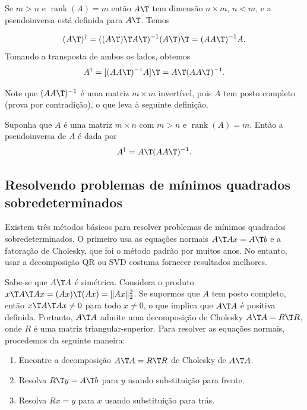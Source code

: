 \documentclass{article}
\DeclareMathOperator{\rank}{rank}
\begin{document}
Se \(m > n\) e \(\rank(A) = m\) então \(A\T \) tem dimensão \(n \times m\), \(n < m\), e a pseudoinversa está definida para \(A\T \). Temos

\[
    (A\T )^{\dagger} = ((A\T )\T A\T )^{-1}(A\T )\T  = (AA\T )^{-1}A.
\] Tomando a transposta de ambos os lados, obtemos
\[
    A^{\dagger} = [(AA\T )^{-1}A]\T  = A\T (AA\T )^{-1}.
\]

Note que \((AA\T )^{-1}\) é uma matriz \(m \times m\) invertível, pois \(A\) tem posto completo (prova por contradição), o que leva à seguinte definição.

\begin{defn}
    Suponha que \(A\) é uma matriz \(m \times n\) com \(m > n\) e \(\rank(A) = m\). Então a pseudoinversa de \(A\) é dada por
    \begin{equation}
        A^{\dagger} = A\T (AA\T )^{-1}.
    \end{equation}
\end{defn}

\subsection{Resolvendo problemas de mínimos quadrados sobredeterminados}

Existem três métodos básicos para resolver problemas de mínimos quadrados sobredeterminados. O primeiro usa as equações normais \(A\T Ax = A\T b\) e a fatoração de Cholesky, que foi o método padrão por muitos anos. No entanto, usar a decomposição QR ou SVD costuma fornecer resultados melhores.

Sabe-se que \(A\T A\) é simétrica. Considera o produto \(x\T A\T Ax = (Ax)\T (Ax) = \Vert Ax \Vert_2^2\). Se supormos que \(A\) tem posto completo, então \(x\T A\T Ax \neq 0\) para todo \(x \neq 0\), o que implica que \(A\T A\) é positiva definida. Portanto, \(A\T A\) admite uma decomposição de Cholesky \(A\T A = R\T R\), onde \(R\) é uma matriz triangular-superior. Para resolver as equações normais, procedemos da seguinte maneira:

\begin{tcolorbox}[title=Resolvendo as equações normais com a fatoração de Cholesky]
    \begin{enumerate}
        \item [a.] Encontre a decomposição \(A\T A = R\T R\) de Cholesky de \(A\T A\).
        \item [b.] Resolva \(R\T y = A\T b\) para \(y\) usando substituição para frente.
        \item [c.] Resolva \(Rx = y\) para \(x\) usando substituição para trás.
    \end{enumerate}
\end{tcolorbox}
\end{document}
